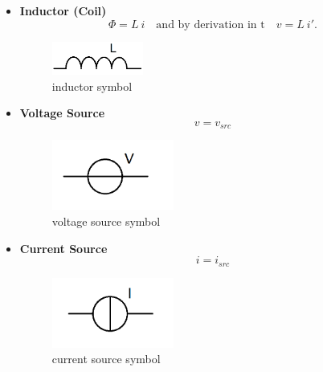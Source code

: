 	\begin{frame}	
		\begin{itemize}
			\item \textbf{Inductor (Coil)} \newline
			\begin{equation}
				\label{eq:inductor law}
				\Phi = L \ i \quad \text{and by derivation in t} \quad v = L \ i'.
			\end{equation}
			\begin{figure}[H]
				\label{fig:inductor symbol}
				\centering
				\includegraphics[width=3cm]{../Tex/pictures/inductance.png}
				\caption{inductor symbol}
			\end{figure}
			
			\item \textbf{Voltage Source} \newline
			\begin{equation}
				\label{eq:voltage source law}
				v = v_{src}
			\end{equation}
			\begin{figure}[H]
				\label{fig:voltage source symbol}
				\centering
				\includegraphics[width=4cm]{../Tex/pictures/voltage_source.png}
				\caption{voltage source symbol}
			\end{figure}
		\end{itemize}
	\end{frame}
			
	\begin{frame}
		\begin{itemize}
			\item \textbf{Current Source} \newline
			\begin{equation}
				\label{eq:current source law}
				i = i_{src}
			\end{equation}
			\begin{figure}[H]
				\label{fig:current source symbol}
				\centering
				\includegraphics[width=4cm]{../Tex/pictures/current_source.png}
				\caption{current source symbol}
			\end{figure}
		\end{itemize}
	\end{frame}

